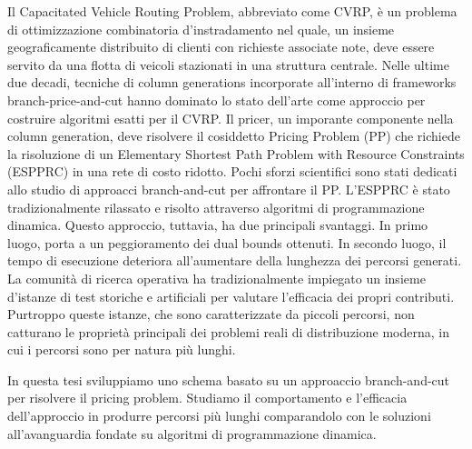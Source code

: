 
\noindent Il Capacitated Vehicle Routing Problem, abbreviato come CVRP,
è un problema di ottimizzazione combinatoria d'instradamento nel quale,
un insieme geograficamente distribuito di clienti con richieste associate note,
deve essere servito da una flotta di veicoli stazionati in una struttura centrale.
Nelle ultime due decadi,
tecniche di column generations incorporate all'interno di frameworks branch-price-and-cut
hanno dominato lo stato dell'arte come approccio
per costruire algoritmi esatti per il CVRP.
Il pricer, un imporante componente nella column generation, deve risolvere
il cosiddetto Pricing Problem (PP) che richiede la risoluzione di un
Elementary Shortest Path Problem with Resource Constraints (ESPPRC)
in una rete di costo ridotto.
Pochi sforzi scientifici sono stati dedicati allo studio di approacci
branch-and-cut per affrontare il PP.
L'ESPPRC è stato tradizionalmente rilassato e risolto attraverso algoritmi di programmazione dinamica.
Questo approccio, tuttavia, ha due principali svantaggi.
In primo luogo, porta a un peggioramento dei dual bounds ottenuti.
In secondo luogo, il tempo di esecuzione deteriora all'aumentare della lunghezza dei percorsi generati.
La comunità di ricerca operativa ha tradizionalmente impiegato
un insieme d'istanze di test storiche e artificiali per valutare
l'efficacia dei propri contributi.
Purtroppo queste istanze, che sono caratterizzate da piccoli percorsi,
non catturano le proprietà principali dei problemi reali di distribuzione moderna,
in cui i percorsi sono per natura più lunghi.

\noindent In questa tesi sviluppiamo
uno schema basato su un approaccio branch-and-cut per risolvere il pricing problem.
Studiamo il comportamento e l'efficacia dell'approccio in produrre percorsi più lunghi
comparandolo con le soluzioni all'avanguardia fondate su algoritmi di programmazione dinamica.
